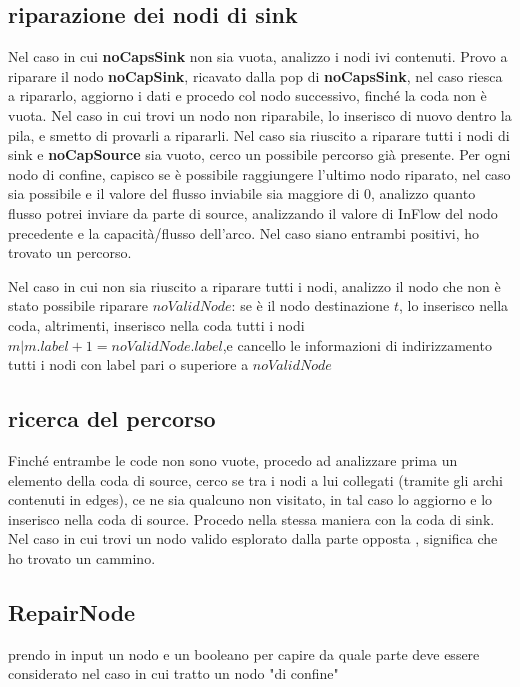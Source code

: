 \documentclass{article}
\begin{document}
\subsection{riparazione dei nodi di sink}
Nel caso in cui \textbf{noCapsSink} non sia vuota, analizzo i nodi ivi contenuti.
Provo a riparare il nodo \textbf{noCapSink}, ricavato dalla pop di \textbf{noCapsSink},
nel caso riesca a ripararlo, aggiorno i dati e procedo col nodo successivo, finché la coda non è vuota.
Nel caso in cui trovi un nodo non riparabile, lo inserisco di nuovo dentro la pila, e smetto di provarli a ripararli.
Nel caso sia riuscito a riparare tutti i nodi di sink e \textbf{noCapSource} sia vuoto, cerco un possibile percorso già presente.
Per ogni nodo di confine, capisco se è possibile raggiungere l'ultimo nodo riparato, nel caso sia possibile
e il valore del flusso inviabile sia maggiore di 0,
analizzo quanto flusso potrei inviare da parte di source,
analizzando il valore di InFlow del nodo precedente e
la capacità/flusso dell'arco.
Nel caso siano entrambi positivi, ho trovato un percorso.

Nel caso in cui non sia riuscito a riparare tutti i nodi, analizzo il nodo che non è stato possibile riparare $noValidNode$:
se è il nodo destinazione $t$, lo inserisco nella coda, altrimenti, inserisco nella coda tutti i nodi $m | m.label +1 = noValidNode.label$,e cancello le informazioni di indirizzamento tutti i nodi con label pari o superiore a $noValidNode$

\subsection{ricerca del percorso}

Finché entrambe le code non sono vuote, procedo ad analizzare prima
un elemento della coda di source, cerco se tra i nodi a lui collegati (tramite gli archi contenuti in edges),
ce ne sia qualcuno non visitato, in tal caso lo aggiorno e lo inserisco nella coda di source.
Procedo nella stessa maniera con la coda di sink.
Nel caso in cui trovi un nodo valido esplorato dalla parte opposta , significa che ho trovato un cammino.


\subsection{RepairNode}

prendo in input un nodo e un booleano per capire da quale parte deve essere considerato nel caso in cui tratto un nodo "di confine"
\end{document}
